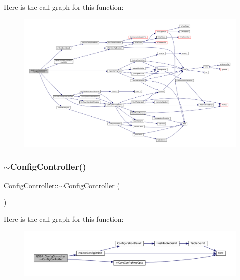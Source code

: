 Here is the call graph for this function\+:
\nopagebreak
\begin{figure}[H]
\begin{center}
\leavevmode
\includegraphics[width=350pt]{class_q_g_b_a_1_1_config_controller_af8c155ead641303df8388286d9cdf494_cgraph}
\end{center}
\end{figure}
\mbox{\label{class_q_g_b_a_1_1_config_controller_adf8d1c79773c708fe1e61d0047e0526d}} 
\subsubsection{\texorpdfstring{$\sim$\+Config\+Controller()}{~ConfigController()}}
{\footnotesize\ttfamily Config\+Controller\+::$\sim$\+Config\+Controller (\begin{DoxyParamCaption}{ }\end{DoxyParamCaption})}

Here is the call graph for this function\+:
\nopagebreak
\begin{figure}[H]
\begin{center}
\leavevmode
\includegraphics[width=350pt]{class_q_g_b_a_1_1_config_controller_adf8d1c79773c708fe1e61d0047e0526d_cgraph}
\end{center}
\end{figure}


